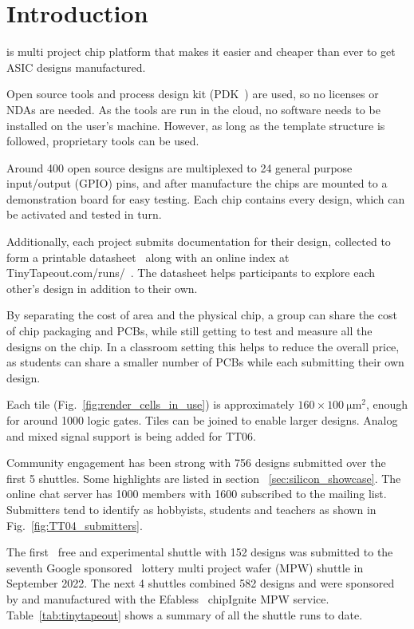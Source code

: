 \section{Introduction}
\label{sec:introduction}
 is multi project chip platform that makes it easier and cheaper than ever to get ASIC designs manufactured.

Open source tools and process design kit (PDK~\cite{pdk}) are used, so no licenses or NDAs are needed. As the tools are run in the cloud, no software needs to be installed on the user's machine. However, as long as the template structure is followed, proprietary tools can be used.

Around 400 open source designs are multiplexed to 24 general purpose input/output (GPIO) pins, and after manufacture the chips are mounted to a demonstration board for easy testing. Each chip contains every design, which can be activated and tested in turn.

Additionally, each project submits documentation for their design, collected to form a printable datasheet~\cite{datasheet} along with an online index at TinyTapeout.com/runs/~\cite{tinytapeoutruns}. The datasheet helps participants to explore each other's design in addition to their own.

By separating the cost of area and the physical chip, a group can share the cost of chip packaging and PCBs, while still getting to test and measure all the designs on the chip. In a classroom setting this helps to reduce the overall price, as students can share a smaller number of PCBs while each submitting their own design.

Each tile (Fig.~\ref{fig:render_cells_in_use}) is approximately $160\times \qty{100}{\micro\meter\squared}$, enough for around 1000 logic gates. Tiles can be joined to enable larger designs. Analog and mixed signal support is being added for TT06.

Community engagement has been strong with 756 designs submitted over the first 5 shuttles. Some highlights are listed in section ~\ref{sec:silicon_showcase}.
The online chat server has 1000 members with 1600 subscribed to the mailing list. Submitters tend to identify as hobbyists, students and teachers as shown in Fig.~\ref{fig:TT04_submitters}.

The first~\cite{firstshuttle} free and experimental shuttle with 152 designs was submitted to the seventh Google sponsored~\cite{googlesponsored} lottery multi project wafer (MPW) shuttle in September 2022.
The next 4 shuttles combined 582 designs and were sponsored by and manufactured with the Efabless~\cite{efabless} chipIgnite MPW service. Table~\ref{tab:tinytapeout} shows a summary of all the shuttle runs to date.


